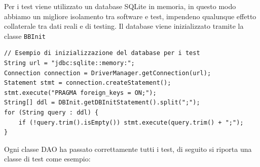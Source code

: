 \documentclass[a4paper]{article}
\begin{document}
Per i test viene utilizzato un database SQLite in memoria, in questo modo abbiamo un migliore isolamento tra software e test, impendeno qualunque effetto collaterale tra dati reali e di testing. Il database viene inizializzato tramite la classe \texttt{BBInit}

\begin{lstlisting}[style=java-style, caption={Esempio creazione database in memoria}]
// Esempio di inizializzazione del database per i test
String url = "jdbc:sqlite::memory:";
Connection connection = DriverManager.getConnection(url);
Statement stmt = connection.createStatement();
stmt.execute("PRAGMA foreign_keys = ON;");
String[] ddl = DBInit.getDBInitStatement().split(";");
for (String query : ddl) {
    if (!query.trim().isEmpty()) stmt.execute(query.trim() + ";");
}
\end{lstlisting}

Ogni classe DAO ha passato correttamente tutti i test, di seguito si riporta una classe di test come esempio:
\end{document}
